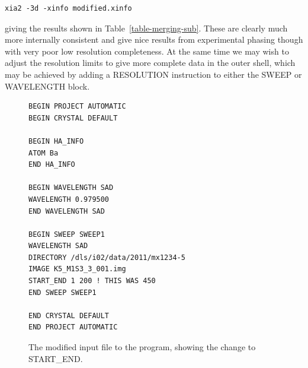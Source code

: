 \documentclass[a4paper, 11pt]{article}
\begin{document}
\begin{verbatim}
xia2 -3d -xinfo modified.xinfo
\end{verbatim}

\noindent
giving the results shown in Table~\ref{table-merging-sub}. 
These are clearly much more internally
consistent and give nice results from experimental phasing though with
very poor low resolution completeness. At the same time 
we may wish to adjust the resolution limits to give more complete data in the 
outer shell, which may be achieved by adding a RESOLUTION instruction to 
either the SWEEP or WAVELENGTH block.

\begin{figure}
\begin{center}
{\small
\begin{verbatim}
BEGIN PROJECT AUTOMATIC
BEGIN CRYSTAL DEFAULT

BEGIN HA_INFO
ATOM Ba
END HA_INFO

BEGIN WAVELENGTH SAD
WAVELENGTH 0.979500
END WAVELENGTH SAD

BEGIN SWEEP SWEEP1
WAVELENGTH SAD
DIRECTORY /dls/i02/data/2011/mx1234-5
IMAGE K5_M1S3_3_001.img
START_END 1 200 ! THIS WAS 450
END SWEEP SWEEP1

END CRYSTAL DEFAULT
END PROJECT AUTOMATIC
\end{verbatim}
}
\end{center}
\caption{The modified input file to the program, showing the change to
START\_END.\label{table-modified-xinfo}}
\end{figure}
\end{document}
